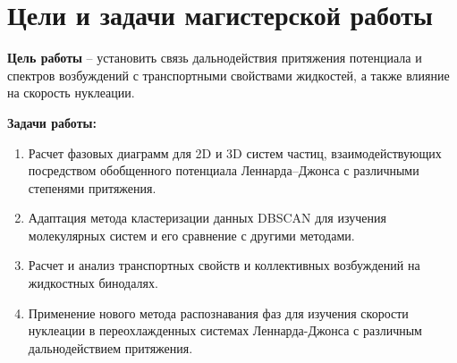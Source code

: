 \section{Цели и задачи магистерской работы}

\textbf{Цель работы} -- установить связь дальнодействия притяжения потенциала и спектров возбуждений с транспортными свойствами жидкостей, а также влияние на скорость нуклеации.

\textbf{Задачи работы:}
\begin{enumerate}
    \item Расчет фазовых диаграмм для 2D и 3D систем частиц, взаимодействующих посредством обобщенного потенциала Леннарда--Джонса с различными степенями притяжения.
    \item Адаптация метода кластеризации данных DBSCAN для изучения молекулярных систем и его сравнение с другими методами.
    \item Расчет и анализ транспортных свойств и коллективных возбуждений на жидкостных бинодалях.
    \item Применение нового метода распознавания фаз для изучения скорости нуклеации в переохлажденных системах Леннарда-Джонса с различным дальнодействием притяжения.
\end{enumerate}
